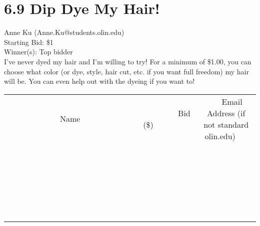 \documentclass[11pt]{article}
\begin{document}
\section*{6.9 Dip Dye My Hair!}
Anne Ku (Anne.Ku@students.olin.edu) \\
Starting Bid: \$1 \\
Winner(s): 
Top bidder \\
I've never dyed my hair and I'm willing to try! For a minimum of \$1.00, you can choose what color (or dye, style, hair cut, etc. if you want full freedom) my hair will be. You can even help out with the dyeing if you want to! \\[6ex]
\begin{tabular}{c c c}
~~~~~~~~~~~~~Name~~~~~~~~~~~~~ & ~~~~~~~~~Bid (\$)~~~~~~~~~ & ~~~Email Address (if not standard olin.edu)~~~ \\
 & & \\
\hline
 & & \\
\hline
 & & \\
\hline
 & & \\
\hline
 & & \\
\hline
 & & \\
\hline
 & & \\
\hline
 & & \\
\hline
 & & \\
\hline
 & & \\
\hline
 & & \\
\hline
 & & \\
\hline
 & & \\
\hline
 & & \\
\hline
 & & \\
\hline
 & & \\
\hline
 & & \\
\hline
 & & \\
\hline
 & & \\
\hline
 & & \\
\hline
 & & \\
\hline
 & & \\
\hline
 & & \\
\hline
 & & \\
\hline
 & & \\
\hline
 & & \\
\hline
\end{tabular}
\clearpage
\end{document}
